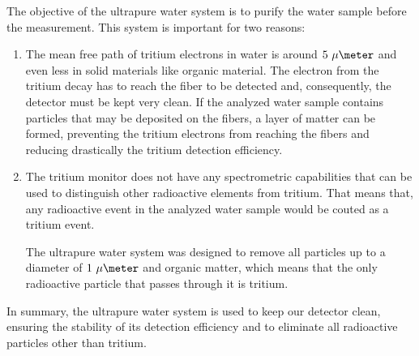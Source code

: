 The objective of the ultrapure water system is to purify the water sample before the measurement. This system is important for two reasons:

\begin{enumerate}

\item{} The mean free path of tritium electrons in water is around $5~\mu\meter$ and even less in solid materials like organic material. The electron from the tritium decay has to reach the fiber to be detected and, consequently, the detector must be kept very clean. If the analyzed water sample contains particles that may be deposited on the fibers, a layer of matter can be formed, preventing the tritium electrons from reaching the fibers and reducing drastically the tritium detection efficiency.

\item{} The tritium monitor does not have any spectrometric capabilities that can be used to distinguish other radioactive elements from tritium. That means that, any radioactive event in the analyzed water sample would be couted as a tritium event.

The ultrapure water system was designed to remove all particles up to a diameter of $1~\mu\meter$ and organic matter, which means that the only radioactive particle that passes through it is tritium. 


\end{enumerate}

In summary, the ultrapure water system is used to keep our detector clean, ensuring the stability of its detection efficiency and to eliminate all radioactive particles other than tritium. %
